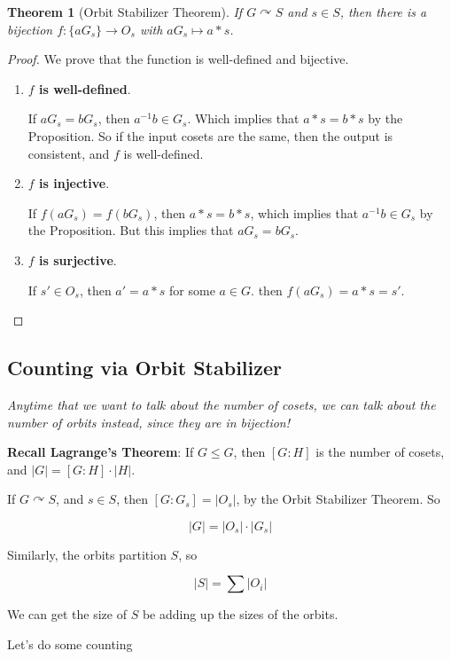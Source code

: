\documentclass[12pt]{article}
\def\acts{\curvearrowright} %
\newtheorem{theorem}{Theorem}
\theoremstyle{remark}
\theoremstyle{remark}
\theoremstyle{remark}
\theoremstyle{remark}
\theoremstyle{remark}
\begin{document}
\begin{theorem}[Orbit Stabilizer Theorem]
  If $G \acts S$ and $s \in S$, then there is a bijection $f: \{aG_s\} \to O_s$
  with $aG_s \mapsto a * s$.
\end{theorem}

\begin{proof}
  We prove that the function is well-defined and bijective.
  \begin{enumerate}
    \item {\bf $f$ is  well-defined}.

      If $aG_s = b G_s$, then $a^{-1} b \in G_s$. Which implies that $a * s = b *
      s$ by the Proposition. So if the input cosets are the same, then the output
      is consistent, and $f$ is well-defined.

    \item {\bf $f$ is injective}.

      If $f(aG_s) = f(b G_s)$, then $a * s = b * s$, which implies that $a^{-1}b
      \in G_s$ by the Proposition. But this implies that $aG_s = b G_s$.

    \item {\bf $f$ is surjective}.

      If $s' \in O_s$, then $a' = a * s$ for some $a \in G$. then $f(a G_s) = a *
      s = s'$.
  \end{enumerate}
\end{proof}

\subsection{Counting via Orbit Stabilizer}

{\it Anytime that we want to talk about the number of cosets, we can talk about the
number of orbits instead, since they are in bijection!}

{\bf Recall Lagrange's Theorem}: If $G \le G$, then $[G : H]$ is the number of
cosets, and $|G| = [G : H] \cdot |H|$.

If $G \acts S$, and $s \in S$, then $[G : G_s] = |O_s|$, by the Orbit Stabilizer
Theorem. So

\[
  |G| = |O_s| \cdot |G_s|
\]

Similarly, the orbits partition $S$, so

\[
  |S| = \sum |O_i|
\]

We can get the size of $S$ be adding up the sizes of the orbits.

Let's do some counting
\end{document}
